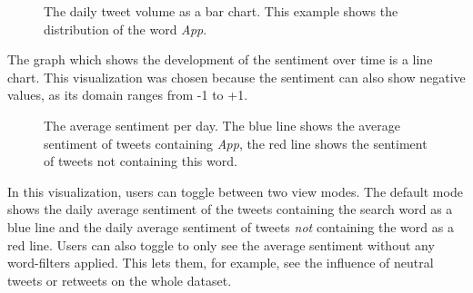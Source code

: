 \begin{figure}[h!tb]
    \caption{The daily tweet volume as a bar chart. This example shows the distribution of the word \emph{App}.}
    \label{fig:volume_barchart}
\end{figure}

The graph which shows the development of the sentiment over time is a line chart. This visualization was chosen because the sentiment can also show negative values, as its domain ranges from -1 to +1. 

\begin{figure}[h!tb]
    \caption{The average sentiment per day. The blue line shows the average sentiment of tweets containing \emph{App}, the red line shows the sentiment of tweets not containing this word.}
    \label{fig:sentiment_linechart}
\end{figure}

In this visualization, users can toggle between two view modes. The default mode shows the daily average sentiment of the tweets containing the search word as a blue line and the daily average sentiment of tweets \emph{not} containing the word as a red line. Users can also toggle to only see the average sentiment without any word-filters applied. This lets them, for example, see the influence of neutral tweets or retweets on the whole dataset.

